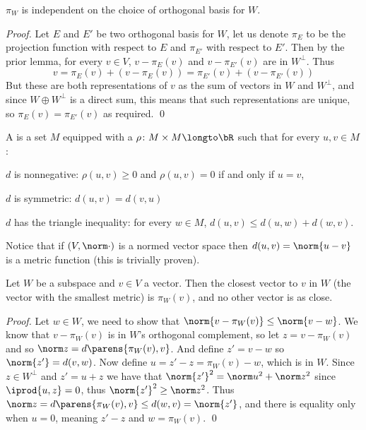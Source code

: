 \begin{thrm*}

    $\pi_W$ is independent on the choice of orthogonal basis for $W$.

\end{thrm*}

\begin{proof}

    Let $E$ and $E'$ be two orthogonal basis for $W$, let us denote $\pi_E$ to be the projection function with respect to $E$ and $\pi_{E'}$ with respect to $E'$.
    Then by the prior lemma, for every $v\in V$, $v-\pi_E(v)$ and $v-\pi_{E'}(v)$ are in $W^\perp$.
    Thus
    \[ v = \pi_E(v) + (v - \pi_E(v)) = \pi_{E'}(v) + (v - \pi_{E'}(v)) \]
    But these are both representations of $v$ as the sum of vectors in $W$ and $W^\perp$, and since $W\oplus W^\perp$ is a direct sum, this means that such representations are unique, so
    $\pi_E(v)=\pi_{E'}(v)$ as required.
    \qed

\end{proof}

\begin{defn*}

    A  is a set $M$ equipped with a  $\rho\colon M\times M\longto\bR$ such that for every $u,v\in M$:
    \benum
        \item $d$ is nonnegative: $\rho(u,v)\geq0$ and $\rho(u,v)=0$ if and only if $u=v$,
        \item $d$ is symmetric: $d(u,v)=d(v,u)$
        \item $d$ has the triangle inequality: for every $w\in M$, $d(u,v)\leq d(u,w)+d(w,v)$.
    \eenum

\end{defn*}

Notice that if $(V,\norm\cdot)$ is a normed vector space then $d(u,v)=\norm{u-v}$ is a metric function (this is trivially proven).

\begin{prop*}

    Let $W$ be a subspace and $v\in V$ a vector.
    Then the closest vector to $v$ in $W$ (the vector with the smallest metric) is $\pi_W(v)$, and no other vector is as close.

\end{prop*}

\begin{proof}

    Let $w\in W$, we need to show that $\norm{v-\pi_W(v)}\leq\norm{v-w}$.
    We know that $v-\pi_W(v)$ is in $W$'s orthogonal complement, so let $z=v-\pi_W(v)$ and so $\norm z=d\parens{\pi_W(v),v}$.
    And define $z'=v-w$ so $\norm{z'}=d(v,w)$.
    Now define $u=z'-z=\pi_W(v)-w$, which is in $W$.
    Since $z\in W^\perp$ and $z'=u+z$ we have that $\norm{z'}^2=\norm u^2+\norm z^2$ since $\iprod{u,z}=0$, thus $\norm{z'}^2\geq\norm z^2$.
    Thus $\norm z=d\parens{\pi_W(v),v}\leq d(w,v)=\norm{z'}$, and there is equality only when $u=0$, meaning $z'-z$ and $w=\pi_W(v)$.
    \qed

\end{proof}

